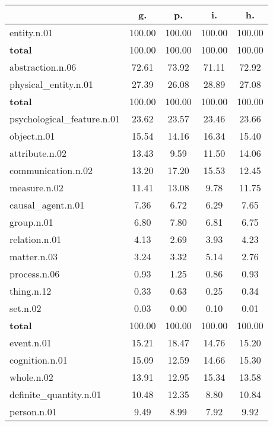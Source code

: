 \begin{table}[h!]
\begin{center}
\begin{tabular}{| l || c | c | c | c |}\hline
 & {\bf g.} & {\bf p.} & {\bf i.} & {\bf h.} \\\hline\hline
entity.n.01 & 100.00  & 100.00  & 100.00  & 100.00 \\\hline\hline
{{\bf total}} & 100.00  & 100.00  & 100.00  & 100.00 \\\hline\hline\hline
abstraction.n.06 & 72.61  & 73.92  & 71.11  & 72.92 \\\hline
physical\_entity.n.01 & 27.39  & 26.08  & 28.89  & 27.08 \\\hline\hline
{{\bf total}} & 100.00  & 100.00  & 100.00  & 100.00 \\\hline\hline\hline
psychological\_feature.n.01 & 23.62  & 23.57  & 23.46  & 23.66 \\\hline
object.n.01 & 15.54  & 14.16  & 16.34  & 15.40 \\\hline
attribute.n.02 & 13.43  & 9.59  & 11.50  & 14.06 \\\hline
communication.n.02 & 13.20  & 17.20  & 15.53  & 12.45 \\\hline
measure.n.02 & 11.41  & 13.08  & 9.78  & 11.75 \\\hline
causal\_agent.n.01 & 7.36  & 6.72  & 6.29  & 7.65 \\\hline
group.n.01 & 6.80  & 7.80  & 6.81  & 6.75 \\\hline
relation.n.01 & 4.13  & 2.69  & 3.93  & 4.23 \\\hline
matter.n.03 & 3.24  & 3.32  & 5.14  & 2.76 \\\hline
process.n.06 & 0.93  & 1.25  & 0.86  & 0.93 \\\hline
thing.n.12 & 0.33  & 0.63  & 0.25  & 0.34 \\\hline
set.n.02 & 0.03  & 0.00  & 0.10  & 0.01 \\\hline\hline
{{\bf total}} & 100.00  & 100.00  & 100.00  & 100.00 \\\hline\hline\hline
event.n.01 & 15.21  & 18.47  & 14.76  & 15.20 \\\hline
cognition.n.01 & 15.09  & 12.59  & 14.66  & 15.30 \\\hline
whole.n.02 & 13.91  & 12.95  & 15.34  & 13.58 \\\hline
definite\_quantity.n.01 & 10.48  & 12.35  & 8.80  & 10.84 \\\hline
person.n.01 & 9.49  & 8.99  & 7.92  & 9.92 \\\hline

\end{tabular}
\end{center}
\end{table}
